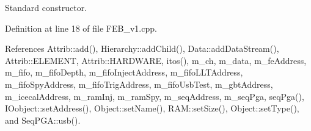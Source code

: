 Standard constructor. 



Definition at line 18 of file F\+E\+B\+\_\+v1.\+cpp.



References Attrib\+::add(), Hierarchy\+::add\+Child(), Data\+::add\+Data\+Stream(), Attrib\+::\+E\+L\+E\+M\+E\+NT, Attrib\+::\+H\+A\+R\+D\+W\+A\+RE, itos(), m\+\_\+ch, m\+\_\+data, m\+\_\+fe\+Address, m\+\_\+fifo, m\+\_\+fifo\+Depth, m\+\_\+fifo\+Inject\+Address, m\+\_\+fifo\+L\+L\+T\+Address, m\+\_\+fifo\+Spy\+Address, m\+\_\+fifo\+Trig\+Address, m\+\_\+fifo\+Usb\+Test, m\+\_\+gbt\+Address, m\+\_\+icecal\+Address, m\+\_\+ram\+Inj, m\+\_\+ram\+Spy, m\+\_\+seq\+Address, m\+\_\+seq\+Pga, seq\+Pga(), I\+Oobject\+::set\+Address(), Object\+::set\+Name(), R\+A\+M\+::set\+Size(), Object\+::set\+Type(), and Seq\+P\+G\+A\+::usb().


